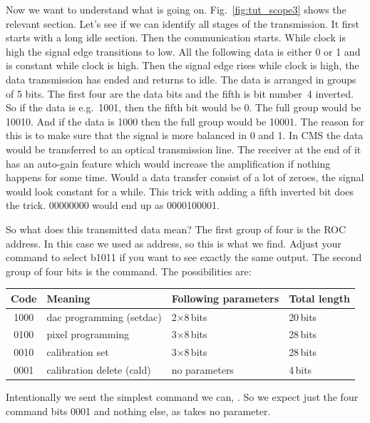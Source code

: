 Now we want to understand what is going on. Fig.~\ref{fig:tut_scope3} shows the relevant section. Let's see if we can identify all stages of the transmission. It first starts with a long idle section. Then the communication starts. While clock is high the signal edge transitions to low. All the following data is either 0 or 1 and is constant while clock is high. Then the signal edge rises while clock is high, the data transmission has ended and returns to idle. The data is arranged in groups of 5 bits. The first four are the data bits and the fifth is bit number~4 inverted. So if the data is e.g.~1001, then the fifth bit would be 0. The full group would be 10010. And if the data is 1000 then the full group would be 10001. The reason for this is to make sure that the signal is more balanced in 0 and 1. In CMS the data would be transferred to an optical transmission line. The receiver at the end of it has an auto-gain feature which would increase the amplification if nothing happens for some time. Would a data transfer consist of a lot of zeroes, the signal would look constant for a while. This trick with adding a fifth inverted bit does the trick. 00000000 would end up as 0000100001.

So what does this transmitted data mean? The first group of four is the ROC address. In this case we used  as address, so this is what we find. Adjust your  command to select b1011 if you want to see exactly the same output. The second group of four bits is the command. The possibilities are:

\bigskip

\begin{tabular}{clll}
    \toprule
    Code & Meaning & Following parameters & Total length \\
    \midrule
    1000 & dac programming (setdac)    & 2$\times$8\,bits & 20\,bits \\
    0100 & pixel programming           & 3$\times$8\,bits & 28\,bits \\
    0010 & calibration set             & 3$\times$8\,bits & 28\,bits \\
    0001 & calibration delete (cald) & no parameters & 4\,bits \\
    \bottomrule
\end{tabular}

\bigskip

Intentionally we sent the simplest command we can, . So we expect just the four command bits 0001 and nothing else, as  takes no parameter.

